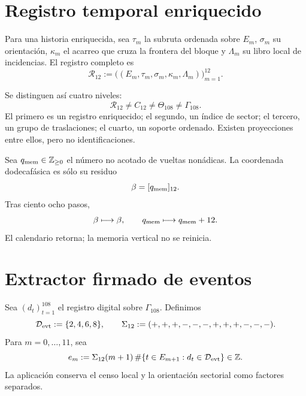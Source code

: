\section{Registro temporal enriquecido}

\begin{definition}
\label{def:u006d-registro-dodecafasico}
Para una historia enriquecida, sea \(\tau_m\) la subruta ordenada sobre
\(E_m\), \(\sigma_m\) su orientación, \(\kappa_m\) el acarreo que cruza la
frontera del bloque y \(\Lambda_m\) su libro local de incidencias. El
registro completo es
\begin{equation}
 \mathcal R_{12}:=
 \bigl(
 (E_m,\tau_m,\sigma_m,\kappa_m,\Lambda_m)
 \bigr)_{m=1}^{12}.
 \label{eq:u006d-registro-r12}
\end{equation}
\end{definition}

Se distinguen así cuatro niveles:
\begin{equation}
 \boxed{
 \mathcal R_{12}
 \neq C_{12}
 \neq\Theta_{108}
 \neq\Gamma_{108}.}
 \label{eq:u006d-cuatro-objetos}
\end{equation}
El primero es un registro enriquecido; el segundo, un índice de sector; el
tercero, un grupo de traslaciones; el cuarto, un soporte ordenado. Existen
proyecciones entre ellos, pero no identificaciones.

Sea \(q_{\rm mem}\in\mathbb Z_{\geq0}\) el número no acotado de vueltas
nonádicas. La coordenada dodecafásica es sólo su residuo
\[
 \beta=[q_{\rm mem}]_{12}.
\]
Tras ciento ocho pasos,
\[
 \beta\longmapsto\beta,
 \qquad
 q_{\rm mem}\longmapsto q_{\rm mem}+12.
\]
El calendario retorna; la memoria vertical no se reinicia.

\section{Extractor firmado de eventos}

Sea \((d_t)_{t=1}^{108}\) el registro digital sobre
\(\Gamma_{108}\). Definimos
\begin{equation}
 \mathcal D_{\rm evt}:=\{2,4,6,8\},
 \qquad
 \Sigma_{12}:=(+,+,+,-,-,-,+,+,+,-,-,-).
 \label{eq:u006d-datos-eventos}
\end{equation}
Para \(m=0,\ldots,11\), sea
\begin{equation}
 e_m:=
 \Sigma_{12}(m+1)\,
 \#\{t\in E_{m+1}:d_t\in\mathcal D_{\rm evt}\}
 \in\mathbb Z.
 \label{eq:u006d-eventos-firmados}
\end{equation}
La aplicación conserva el censo local y la orientación sectorial como
factores separados.

